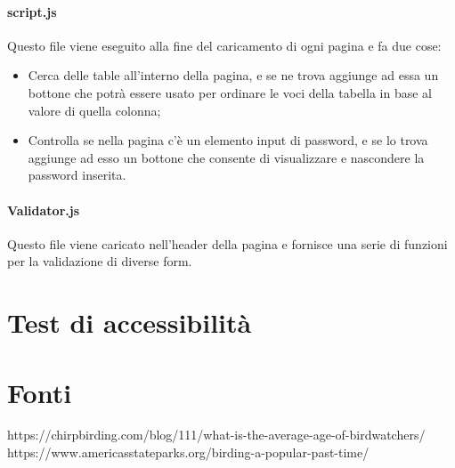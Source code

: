 \documentclass[12pt, a4paper]{article}
\begin{document}
    \paragraph{script.js} Questo file viene eseguito alla fine del caricamento di ogni pagina e fa due cose:
    \begin{itemize}
        \item Cerca delle table all'interno della pagina, e se ne trova aggiunge ad essa un bottone che potrà essere usato per ordinare le voci della tabella in base al valore di quella colonna;
        \item Controlla se nella pagina c'è un elemento input di password, e se lo trova aggiunge ad esso un bottone che consente di visualizzare e nascondere la password inserita.
    \end{itemize}

    \paragraph{Validator.js} Questo file viene caricato nell'header della pagina e fornisce una serie di funzioni per la validazione di diverse form.


    \section{Test di accessibilità}

    \section{Fonti}
    https://chirpbirding.com/blog/111/what-is-the-average-age-of-birdwatchers/
    https://www.americasstateparks.org/birding-a-popular-past-time/
\end{document}
